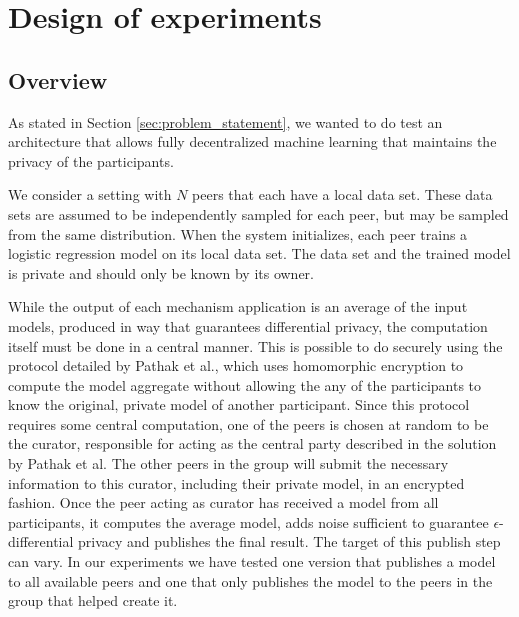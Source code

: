 \chapter{Design of experiments}

\section{Overview}
\label{sec:experiment_overview}
As stated in Section \ref{sec:problem_statement}, we wanted to do test an architecture that allows fully decentralized machine learning that maintains the privacy of the participants. 

We consider a setting with $N$ peers that each have a local data set. These data sets are assumed to be independently sampled for each peer, but may be sampled from the same distribution. When the system initializes, each peer trains a logistic regression model on its local data set. The data set and the trained model is private and should only be known by its owner.


While the output of each mechanism application is an average of the input models, produced in way that guarantees differential privacy, the computation itself must be done in a central manner. This is possible to do securely using the protocol detailed by Pathak et al., which uses homomorphic encryption to compute the model aggregate without allowing the any of the participants to know the original, private model of another participant\citep{pathak2010diffprivhomo}. Since this protocol requires some central computation, one of the peers is chosen at random to be the curator, responsible for acting as the central party described in the solution by Pathak et al. The other peers in the group will submit the necessary information to this curator, including their private model, in an encrypted fashion. Once the peer acting as curator has received a model from all participants, it computes the average model, adds noise sufficient to guarantee $\epsilon$-differential privacy and publishes the final result. The target of this publish step can vary. In our experiments we have tested one version that publishes a model to all available peers and one that only publishes the model to the peers in the group that helped create it.

